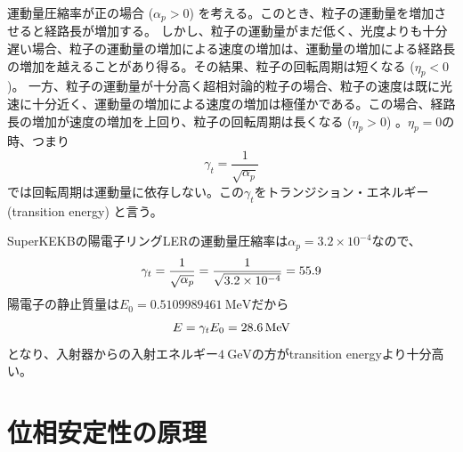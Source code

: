 \documentclass[10pt,a4paper]{jlreq}
\begin{document}
運動量圧縮率が正の場合 ($\alpha_p>0$) を考える。このとき、粒子の運動量を増加させると経路長が増加する。 しかし、粒子の運動量がまだ低く、光度よりも十分遅い場合、粒子の運動量の増加による速度の増加は、運動量の増加による経路長の増加を越えることがあり得る。その結果、粒子の回転周期は短くなる ($\eta_p < 0$)。
一方、粒子の運動量が十分高く超相対論的粒子の場合、粒子の速度は既に光速に十分近く、運動量の増加による速度の増加は極僅かである。この場合、経路長の増加が速度の増加を上回り、粒子の回転周期は長くなる ($\eta_p>0$) 。$\eta_p = 0$の時、つまり
%
\begin{equation}
  \gamma_t = \frac{1}{\sqrt{\alpha_p}}
\end{equation}
%
では回転周期は運動量に依存しない。この$\gamma_t$をトランジション・エネルギー (transition energy) と言う。

\vspace{\baselineskip}

\begin{tcolorbox}[title=\textgt{SuperKEKB LERのtransition energy}]
  SuperKEKBの陽電子リングLERの運動量圧縮率は$\alpha_p = 3.2 \times 10^{-4}$なので、
  \begin{equation}
    \gamma_t = \frac{1}{\sqrt{\alpha_p}}= \frac{1}{\sqrt{3.2 \times 10^{-4}}} = 55.9 \notag
  \end{equation}
  陽電子の静止質量は$E_0 = \SI{0.5109989461}{\mega\electronvolt}$だから
  \begin{equation}
    E = \gamma_t E_0 = \SI{28.6}{\mega\electronvolt} \notag
  \end{equation}
  となり、入射器からの入射エネルギー$\SI{4}{\giga\electronvolt}$の方がtransition energyより十分高い。
\end{tcolorbox}

\section{位相安定性の原理}
\end{document}
